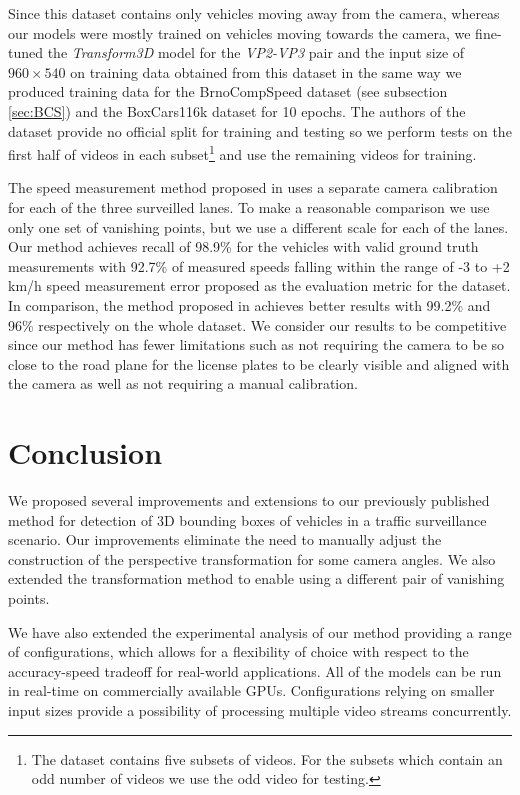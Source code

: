 \documentclass[twocolumn]{svjour3}          \smartqed  \usepackage{graphicx}
\begin{document}
Since this dataset contains only vehicles moving away from the camera, whereas our models were mostly trained on vehicles moving towards the camera, we fine-tuned the \textit{Transform3D} model for the \textit{VP2-VP3} pair and the input size of $960 \times 540$ on training data obtained from this dataset in the same way we produced training data for the BrnoCompSpeed dataset (see subsection \ref{sec:BCS}) and the BoxCars116k dataset \cite{boxcars} for 10 epochs. The authors of the dataset provide no official split for training and testing so we perform tests on the first half of videos in each subset\footnote{The dataset contains five subsets of videos. For the subsets which contain an odd number of videos we use the odd video for testing.} and use the remaining videos for training.

The speed measurement method proposed in \cite{luvizon} uses a separate camera calibration for each of the three surveilled lanes. To make a reasonable comparison we use only one set of vanishing points, but we use a different scale for each of the lanes. Our method achieves recall of 98.9\% for the vehicles with valid ground truth measurements with 92.7\% of measured speeds falling within the range of -3 to +2 km/h speed measurement error proposed as the evaluation metric for the dataset. In comparison, the method proposed in \cite{luvizon} achieves better results with 99.2\% and 96\% respectively on the whole dataset. We consider our results to be competitive since our method has fewer limitations such as not requiring the camera to be so close to the road plane for the license plates to be clearly visible and aligned with the camera as well as not requiring a manual calibration.

\section{Conclusion}

We proposed several improvements and extensions to our previously published method \cite{CVWW2019} for detection of 3D bounding boxes of vehicles in a traffic surveillance scenario. Our improvements eliminate the need to manually adjust the construction of the perspective transformation for some camera angles. We also extended the transformation method to enable using a different pair of vanishing points. 

We have also extended the experimental analysis of our method providing a range of configurations, which allows for a flexibility of choice with respect to the accuracy-speed tradeoff for real-world applications. All of the models can be run in real-time on commercially available GPUs. Configurations relying on smaller input sizes provide a possibility of processing multiple video streams concurrently.
\end{document}
